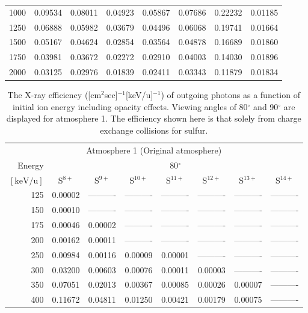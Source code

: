 \begin{table}[ht]
\begin{tabular}{r|c|c|c|c|c|c|c}
     1000 & 0.09534 & 0.08011 & 0.04923 & 0.05867 & 0.07686 & 0.22232 & 0.01185 \\
     1250 & 0.06888 & 0.05982 & 0.03679 & 0.04496 & 0.06068 & 0.19741 & 0.01664 \\
     1500 & 0.05167 & 0.04624 & 0.02854 & 0.03564 & 0.04878 & 0.16689 & 0.01860 \\
     1750 & 0.03981 & 0.03672 & 0.02272 & 0.02910 & 0.04003 & 0.14030 & 0.01896 \\
     2000 & 0.03125 & 0.02976 & 0.01839 & 0.02411 & 0.03343 & 0.11879 & 0.01834 \\ \cline{1-8}
    \end{tabular}
    \label{tab:XRayEffOCX1}
\end{table}

\begin{table}[ht]
    \centering
    \caption{The X-ray efficiency ([cm$^2$sec]$^{-1}$[keV/u]$^{-1}$) of outgoing photons as a function of initial ion energy including opacity effects. Viewing angles of 80$^\circ$ and 90$^\circ$ are displayed for atmosphere 1. The efficiency shown here is that solely from charge exchange collisions for sulfur.}
    \begin{tabular}{r|c|c|c|c|c|c|c}
    \multicolumn{8}{c}{Atmosphere 1 (Original atmosphere)} \\ \cline{2-8}
    Energy & \multicolumn{7}{c}{80$^\circ$} \\ \cline{2-8}
    $\mathrm{[keV/u]}$ & S$^{8+}$ & S$^{9+}$ & S$^{10+}$ & S$^{11+}$ & S$^{12+}$ & S$^{13+}$ & S$^{14+}$ \\ \cline{1-8}
      125 & 0.00002 & ---------- & ---------- & ---------- & ---------- & ---------- & ---------- \\
      150 & 0.00010 & ---------- & ---------- & ---------- & ---------- & ---------- & ---------- \\
      175 & 0.00046 & 0.00002 & ---------- & ---------- & ---------- & ---------- & ---------- \\
      200 & 0.00162 & 0.00011 & ---------- & ---------- & ---------- & ---------- & ---------- \\
      250 & 0.00984 & 0.00116 & 0.00009 & 0.00001 & ---------- & ---------- & ---------- \\
      300 & 0.03200 & 0.00603 & 0.00076 & 0.00011 & 0.00003 & ---------- & ---------- \\
      350 & 0.07051 & 0.02013 & 0.00367 & 0.00085 & 0.00026 & 0.00007 & ---------- \\
      400 & 0.11672 & 0.04811 & 0.01250 & 0.00421 & 0.00179 & 0.00075 & ---------- \\

\end{tabular}
\end{table}
